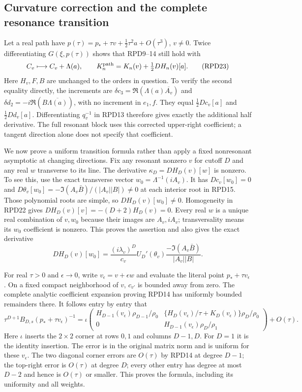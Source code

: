 \documentclass[11pt]{article}
\begin{document}
\subsection{Curvature correction and the complete resonance transition}

Let a real path have
$p(\tau)=p_*+\tau v+\tfrac12\tau^2a+O(\tau^3)$, $v\ne0$.
Twice differentiating $G(\xi,p(\tau))$ shows that RPD9--14 still
hold with
\[
 C_v\longmapsto C_v+\Lambda(a),\qquad
 K_n^{\rm path}=K_n(v)+\tfrac12 DH_n(v)[a].\tag{RPD23}
\]
Here $H_v,F,B$ are unchanged to the orders in question.
To verify the second equality directly, the increments are
$\delta c_3=\Re(\Lambda(a)\overline{A_v})$
and $\delta d_2=-i\Re(B\overline{\Lambda(a)})$, with no increment
in $e_1,f$.  They equal $\tfrac12 Dc_v[a]$ and
$\tfrac12 Dd_v[a]$.  Differentiating $q_v^{-1}$ in RPD13 therefore
gives exactly the additional half derivative.  The full resonant
block uses this corrected upper-right coefficient; a tangent
direction alone does not specify that coefficient.

We now prove a uniform transition formula rather than apply a
fixed nonresonant asymptotic at changing directions.  Fix any
resonant nonzero $v$ for cutoff $D$ and any real $w$ transverse to
its line.  The derivative
$\kappa_D=DH_D(v)[w]$ is nonzero.  To see this, use the exact
transverse vector $w_0=\Lambda^{-1}(iA_v)$.
It has $Dc_v[w_0]=0$ and
$D\theta_v[w_0]=-\Im(A_v\bar B)/(|A_v||B|)\ne0$ at each
interior root in RPD15.  Those polynomial roots are simple, so
$DH_D(v)[w_0]\ne0$.  Homogeneity in RPD22 gives
$DH_D(v)[v]=-(D+2)H_D(v)=0$.
Every real $w$ is a unique real combination of $v,w_0$ because
their images are $A_v,iA_v$; transversality means its $w_0$
coefficient is nonzero.  This proves the assertion and also gives
the exact derivative
\[
 DH_D(v)[w_0]=\frac{(i\lambda_v)^D}{c_v}
 U_D'(\theta_v)\frac{-\Im(A_v\bar B)}{|A_v||B|}.\tag{RPD24}
\]

For real $\tau>0$ and $\epsilon\to0$, write
$v_\epsilon=v+\epsilon w$ and evaluate the literal point
$p_*+\tau v_\epsilon$.  On a fixed compact neighborhood of $v$,
$c_{v'}$ is bounded away from zero.  The complete analytic
coefficient expansion proving RPD14 has uniformly bounded
remainders there.  It follows entry by entry that
\[
 \tau^{D+1}B_{D,s}(p_*+\tau v_\epsilon)^{-1}
 =\iota\begin{pmatrix}
 H_{D-1}(v_\epsilon)\rho_{D-1}/\rho_0&
 \{H_D(v_\epsilon)/\tau+K_D(v_\epsilon)\}\rho_D/\rho_0\\
 0&H_{D-1}(v_\epsilon)\rho_D/\rho_1
 \end{pmatrix}+O(\tau).
 \tag{RPD25}
\]
Here $\iota$ inserts the $2\times2$ corner at rows $0,1$ and columns
$D-1,D$.  For $D=1$ it is the identity insertion.  The error is in
the original matrix norm and is uniform for these $v_\epsilon$.
The two diagonal corner errors are $O(\tau)$ by RPD14 at degree
$D-1$; the top-right error is $O(\tau)$ at degree $D$; every other
entry has degree at most $D-2$ and hence is $O(\tau)$ or smaller.
This proves the formula, including its uniformity and all weights.
\end{document}
